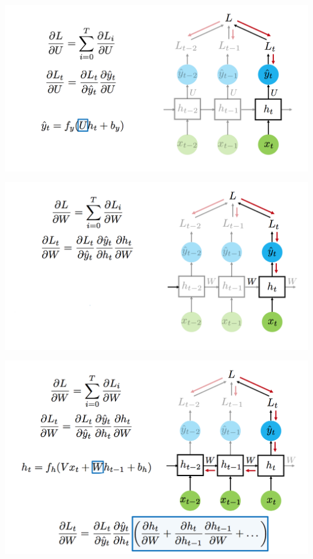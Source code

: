 \documentclass[notes,12pt, aspectratio=169]{beamer}
\begin{document}
\begin{frame}
\begin{center}
	\includegraphics[width=.9\linewidth]{rnn5.png}
\end{center}
\end{frame}


\begin{frame}
\begin{center}
	\includegraphics[width=.9\linewidth]{rnn6.png}
\end{center}
\end{frame}


\begin{frame}
\begin{center}
	\includegraphics[width=.9\linewidth]{rnn7.png}
\end{center}
\end{frame}
\end{document}
